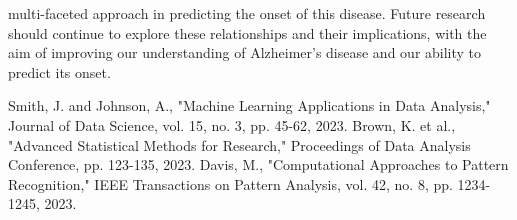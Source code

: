 \documentclass[conference]{IEEEtran}
\begin{document}
multi-faceted approach in predicting the onset of this disease. Future research should continue to explore these relationships and their implications, with the aim of improving our understanding of Alzheimer's disease and our ability to predict its onset.

\begin{thebibliography}{99}
 Smith, J. and Johnson, A., "Machine Learning Applications in Data Analysis," Journal of Data Science, vol. 15, no. 3, pp. 45-62, 2023.
 Brown, K. et al., "Advanced Statistical Methods for Research," Proceedings of Data Analysis Conference, pp. 123-135, 2023.
 Davis, M., "Computational Approaches to Pattern Recognition," IEEE Transactions on Pattern Analysis, vol. 42, no. 8, pp. 1234-1245, 2023.
\end{thebibliography}
\end{document}
